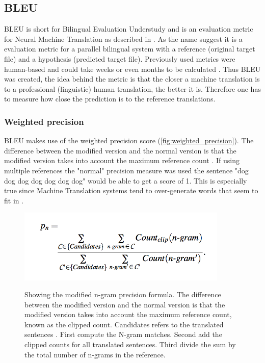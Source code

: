 \subsection{BLEU}

BLEU is short for Bilingual Evaluation Understudy and is an evaluation metric for Neural Machine Translation as described in \cite{papineni2002bleu}. As the name suggest it is a evaluation metric for a parallel bilingual system with a reference (original target file) and a hypothesis (predicted target file). Previously used metrics were human-based and could take weeks or even months to be calculated \cite{papineni2002bleu}. Thus BLEU was created, the idea behind the metric is that the closer a machine translation is to a professional (linguistic) human translation, the better it is. Therefore one has to measure how close the prediction is to the reference translations.

\subsubsection{Weighted precision}
BLEU makes use of the weighted precision score (\autoref{fig:weighted_precision}). The difference between the modified version and the normal version is that the modified version takes into account the maximum reference count \cite{chan}. If using multiple references the "normal" precision measure was used the sentence "dog dog dog dog dog dog dog" would be able to get a score of 1. This is especially true since Machine Translation systems tend to over-generate words that seem to fit in \cite{papineni2002bleu}.

\begin{figure}[h]
\caption{Showing the modified n-gram precision formula. The difference between the modified version and the normal version is that the modified version takes into account the maximum reference count, known as the clipped count. Candidates refers to the translated sentences \cite{chan} \cite{papineni2002bleu}. First compute the N-gram matches. Second add the clipped counts for all translated sentences. Third divide the sum by the total number of n-grams in the reference. \cite{chan}}
 \centering 
 \includegraphics[width=10cm]{Bachelor CSAI thesis template/images/weighted_precision.png}
 \label{fig:weighted_precision}
\end{figure}

